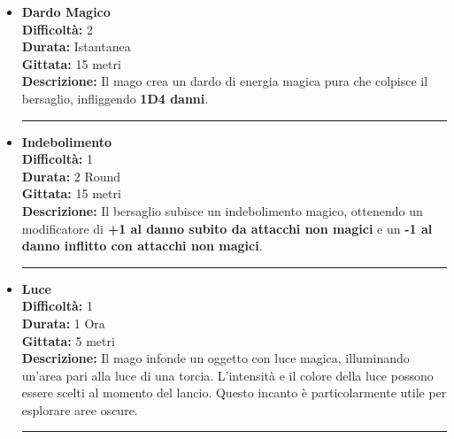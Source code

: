 \documentclass[./magie.tex]{subfiles}
\begin{document}
\begin{itemize}

\item \textbf{Dardo Magico} \\
\textbf{Difficoltà:} 2 \\
\textbf{Durata:} Istantanea \\
\textbf{Gittata:} 15 metri \\
\textbf{Descrizione:} Il mago crea un dardo di energia magica pura che colpisce il bersaglio, infliggendo \textbf{1D4 danni}.

\vspace{0.2cm}
\noindent
\begin{center}
\rule{\textwidth}{0.4pt} 
\end{center}
\vspace{0.2cm}

\item \textbf{Indebolimento} \\
\textbf{Difficoltà:} 1 \\
\textbf{Durata:} 2 Round \\
\textbf{Gittata:} 15 metri \\
\textbf{Descrizione:} Il bersaglio subisce un indebolimento magico, ottenendo un modificatore di \textbf{+1 al danno subito da attacchi non magici} e un \textbf{-1 al danno inflitto con attacchi non magici}.

\vspace{0.2cm}
\noindent
\begin{center}
\rule{\textwidth}{0.4pt} 
\end{center}
\vspace{0.2cm}

\item \textbf{Luce} \\
\textbf{Difficoltà:} 1 \\
\textbf{Durata:} 1 Ora \\
\textbf{Gittata:} 5 metri \\
\textbf{Descrizione:} Il mago infonde un oggetto con luce magica, illuminando un'area pari alla luce di una torcia. L'intensità e il colore della luce possono essere scelti al momento del lancio. Questo incanto è particolarmente utile per esplorare aree oscure.

\vspace{0.2cm}
\noindent
\begin{center}
\rule{\textwidth}{0.4pt} 
\end{center}
\vspace{0.2cm}


\end{itemize}
\end{document}
